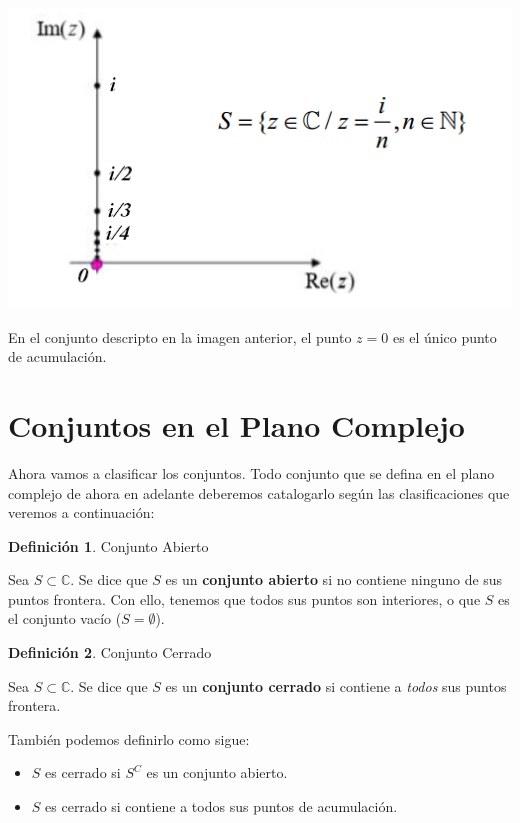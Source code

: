 \documentclass[12pt]{article}
\theoremstyle{definition}
\newtheorem{definition}{Definici\'on}[section]
\begin{document}
\begin{center}
	\includegraphics[scale=0.7]{acumulacion.png}
\end{center}

En el conjunto descripto en la imagen anterior, el punto $z=0$ es el \'unico punto de acumulaci\'on.

\section{Conjuntos en el Plano Complejo}
Ahora vamos a clasificar los conjuntos. Todo conjunto que se defina en el plano complejo de ahora en adelante deberemos catalogarlo seg\'un las clasificaciones que veremos a continuaci\'on: \\

\colorbox{green!40!white!80}{\parbox{\linewidth}{
\theoremstyle{definition}
\begin{definition} Conjunto Abierto

Sea $S \subset \mathbb{C}$. Se dice que $S$ es un \textbf{conjunto abierto} si no contiene ninguno de sus puntos frontera. Con ello, tenemos que todos sus puntos son interiores, o que $S$ es el conjunto vac\'io ($S = \emptyset$).

\end{definition}}}
\linebreak
\linebreak

\colorbox{green!40!white!80}{\parbox{\linewidth}{
\theoremstyle{definition}
\begin{definition} Conjunto Cerrado

Sea $S \subset \mathbb{C}$. Se dice que $S$ es un \textbf{conjunto cerrado} si contiene a \textit{todos} sus puntos frontera.

Tambi\'en podemos definirlo como sigue:
\begin{itemize}
	\item $S$ es cerrado si $S^C$ es un conjunto abierto.
	\item $S$ es cerrado si contiene a todos sus puntos de acumulaci\'on.
\end{itemize}

\end{definition}}}
\linebreak
\linebreak
\end{document}
